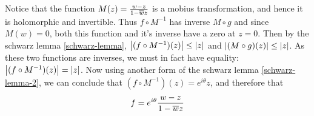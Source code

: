 \documentclass{homework}
\begin{document}
\begin{solution}
                                                                                                                                                                                                                                                                                                                                                                                        Notice that the function $M(z) = \frac{w-z}{1-\overline{w}z}$ is a mobius transformation, and hence it is holomorphic and invertible. Thus $f\circ M^{-1}$ has inverse $M \circ g$ and since $M(w)=0$, both this function and it's inverse have a zero at $z=0$. Then by the schwarz lemma \ref{schwarz-lemma}, $\left|(f\circ M^{-1})(z)\right| \leq \left|z\right|$ and $\left|(M\circ g)(z)\right| \leq \left|z\right|$.
                                                                                                                                                                                                                                                                                                                                                                                        As these two functions are inverses, we must in fact have equality: $\left|(f\circ M^{-1})(z)\right| = \left|z\right|$. Now using another form of the schwarz lemma \ref{schwarz-lemma-2}, we can conclude that $(f\circ M^{-1})(z) = e^{i\theta}z$, and therefore that
                                                                                                                                                                                                                                                                                                                                                                                        \[f = e^{i\theta}\frac{w-z}{1-\overline{w}z}\]
                                                                                                                                                                                                                                                                                                                                                                                        \end{solution}
                                                                                                                                                                                                                                                                                                                                                                                        
\end{document}
